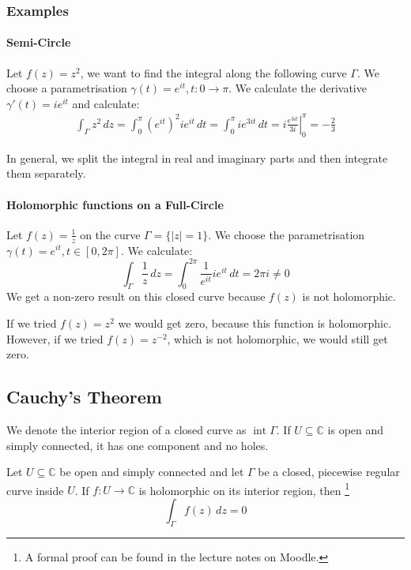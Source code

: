 \subsubsection{Examples}
\paragraph{Semi-Circle}
Let $f(z)=z^2$, we want to find the integral along the following curve $\Gamma$. We choose a parametrisation $\gamma(t)= e^{it}, t: 0\to \pi$.
We calculate the derivative $\gamma'(t)=i e^{it}$ and calculate:
\begin{equation*}
	\begin{split}
		\int_\Gamma z^2\,dz = \int_0^\pi (e^{it})^2 ie^{it} \,dt= \int_0^\pi ie^{3it}\,dt = i\left.\frac{e^{3it}}{3i} \right|_0^\pi=-\frac 23
	\end{split}
\end{equation*}

In general, we split the integral in real and imaginary parts and then integrate them separately.



\paragraph{Holomorphic functions on a Full-Circle}
Let $f(z)=\frac 1z$ on the curve $\Gamma = \{|z|=1\}$.
We choose the parametrisation $\gamma(t)=e^{it},t\in[0,2\pi]$. We calculate:
\begin{equation*}
	\int_\Gamma \frac 1z \,dz = \int_0^{2\pi}\frac 1{e^{it}}ie^{it}\,dt = 2\pi i\ne 0
\end{equation*}
We get a non-zero result on this closed curve because $f(z)$ is not holomorphic.

If we tried $f(z)=z^2$ we would get zero, because this function is holomorphic. However, if we tried $f(z)=z^{-2}$, which is not holomorphic, we would still get zero.

\subsection{Cauchy's Theorem}
We denote the interior region of a closed curve as $\operatorname{int}\Gamma$. If $U\subseteq \mathbb C$ is open and simply connected, it has one component and no holes.

Let $U\subseteq \mathbb C$ be open and simply connected and let $\Gamma$ be a closed, piecewise regular curve inside $U$. If $f:U\to \mathbb C$ is holomorphic on its interior region, then \footnote{A formal proof can be found in the lecture notes on Moodle.}
\begin{equation*}
	\int_\Gamma f(z)\,dz =0 
\end{equation*}


